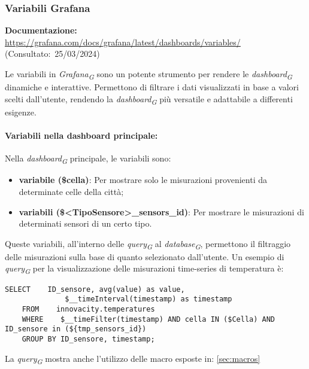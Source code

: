 \subsubsection{Variabili Grafana}
\textbf{Documentazione:}
\url{https://grafana.com/docs/grafana/latest/dashboards/variables/} (Consultato:~25/03/2024)


Le variabili in \textit{Grafana}\textsubscript{\textit{G}} sono un potente strumento per rendere le \textit{dashboard}\textsubscript{\textit{G}} dinamiche e interattive. Permettono di filtrare i dati visualizzati in base a valori scelti dall'utente, rendendo la \textit{dashboard}\textsubscript{\textit{G}} più versatile e adattabile a differenti esigenze.
\paragraph*{Variabili nella dashboard principale:}
Nella \textit{dashboard}\textsubscript{\textit{G}} principale, le variabili sono:
\begin{itemize}
    \item \textbf{variabile (\$cella)}: Per mostrare solo le misurazioni provenienti da determinate celle della città;
    \item \textbf{variabili (\$<TipoSensore>\_sensors\_id)}: Per mostrare le misurazioni di determinati sensori di un certo tipo.
\end{itemize}
Queste variabili, all'interno delle \textit{query}\textsubscript{\textit{G}} al \textit{database}\textsubscript{\textit{G}}, permettono il filtraggio delle misurazioni sulla base di quanto selezionato dall'utente.
Un esempio di \textit{query}\textsubscript{\textit{G}} per la visualizzazione delle misurazioni time-series di temperatura è:
\begin{lstlisting}[style=code]
    SELECT    ID_sensore, avg(value) as value,
              $__timeInterval(timestamp) as timestamp
    FROM    innovacity.temperatures 
    WHERE    $__timeFilter(timestamp) AND cella IN ($Cella) AND ID_sensore in (${tmp_sensors_id})
    GROUP BY ID_sensore, timestamp;
\end{lstlisting}

La \textit{query}\textsubscript{\textit{G}} mostra anche l'utilizzo delle macro esposte in: \ref{sec:macros}

